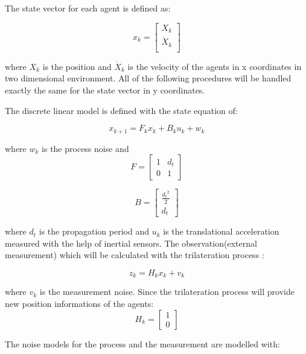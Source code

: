 The state vector for each agent is defined as:

\begin{equation}
x_k = \begin{bmatrix}
X_k \\
\dot{X}_k\\
\end{bmatrix}
\end{equation}
	
where $X_k$ is the position and $\dot{X}_k$ is the velocity of the agents in x coordinates in two dimensional environment. All of the following procedures will be handled exactly the same for the state vector in y coordinates.

The discrete linear model is defined with the state equation of:

\begin{equation}
x_{k+1} = F_k     x_{k} + B_ku_k + w_k
\end{equation}
	
where $w_k$ is the process noise and 
\begin{equation}
F = \begin{bmatrix}
1 & d_t\\
0 & 1
\end{bmatrix}   
\end{equation}
	
\begin{equation}
B = \begin{bmatrix}
\frac{{d_t}^2}{2} \\
d_t
\end{bmatrix}
\end{equation}

where $d_t$ is the propagation period and $u_k$ is the translational acceleration measured with the help of inertial sensors. The observation(external measurement) which will be calculated with the trilateration process :

\begin{equation}
z_k = H_kx_k + v_k
\end{equation}

where $v_k$ is the measurement noise. Since the trilateration process will provide new position informations of the agents:
\begin{equation}
H_k = \begin{bmatrix}
1\\0
\end{bmatrix}
\end{equation}
	
The noise models for the process and the measurement are modelled with:

